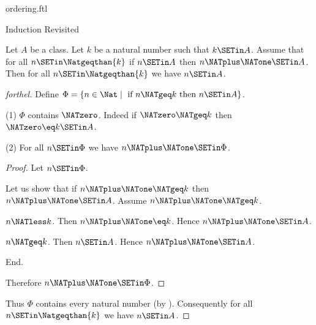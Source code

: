 \documentclass{naproche-library}
\begin{document}
\begin{smodule}[title=The Standard Ordering of the Natural Numbers]{ordering.ftl}
\begin{sfragment}{Induction Revisited}
  \begin{theorem}[forthel,id=ARITHMETIC_04_4976599269113856]
    Let $A$ be a class.
    Let $k$ be a natural number such that $k \SETin A$.
    Assume that for all $n \SETin \Natgeqthan{k}$ if $n \SETin A$ then $n \NATplus \NATone \SETin A$.
    Then for all $n \SETin \Natgeqthan{k}$ we have $n \SETin A$.
  \end{theorem}
  \begin{proof}[forthel]
    Define $\Phi = \{n \in \Nat \mid\text{ if }n \NATgeq k\text{ then }n \SETin A \}$.

    (1) $\Phi$ contains $\NATzero$.
    Indeed if $\NATzero \NATgeq k$ then $\NATzero \eq k \SETin A$.

    (2) For all $n \SETin \Phi$ we have $n \NATplus \NATone \SETin \Phi$.
    \begin{proof}
      Let $n \SETin \Phi$.

      Let us show that if $n \NATplus \NATone \NATgeq k$ then $n \NATplus \NATone \SETin A$.
        Assume $n \NATplus \NATone \NATgeq k$.

        \begin{case}{$n \NATless k$.}
          Then $n \NATplus \NATone \eq k$.
          Hence $n \NATplus \NATone \SETin A$.
        \end{case}

        \begin{case}{$n \NATgeq k$.}
          Then $n \SETin A$.
          Hence $n \NATplus \NATone \SETin A$.
        \end{case}
      End.

      Therefore $n \NATplus \NATone \SETin \Phi$.
    \end{proof}

    Thus $\Phi$ contains every natural number (by ).
    Consequently for all $n \SETin \Natgeqthan{k}$ we have $n \SETin A$.
  \end{proof}
\end{sfragment}
\end{smodule}
\end{document}
